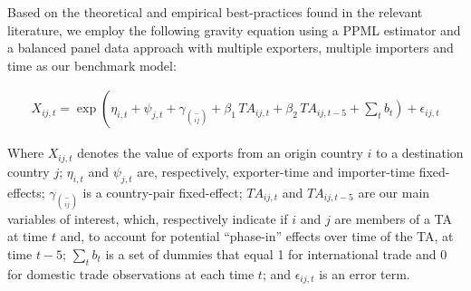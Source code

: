 Based on the theoretical and empirical best-practices found in the
relevant literature, we employ the following gravity equation using a
PPML estimator and a balanced panel data approach with multiple
exporters, multiple importers and time as our benchmark model:

\begin{multline}
    X_{ij,t} = \exp\left(\eta_{i,t} + \psi_{j,t} + \gamma_{\binom{-}{ij}} + \beta_{1} \, TA_{ij,t} \right. + \beta_{2} \, TA_{ij,t-5} + \left. \sum_{t} b_{t} \right) + \epsilon_{ij,t}
\end{multline}

Where \(X_{ij,t}\) denotes the value of exports from an origin country
\(i\) to a destination country \(j\); \(\eta_{i,t}\) and \(\psi_{j,t}\)
are, respectively, exporter-time and importer-time fixed-effects;
\(\gamma_{\binom{-}{ij}}\) is a country-pair fixed-effect;
\({TA}_{ij,t}\) and \({TA}_{ij,t - 5}\) are our main variables of
interest, which, respectively indicate if \(i\) and \(j\) are members of
a TA at time \(t\) and, to account for potential ``phase-in'' effects
over time of the TA, at time \(t - 5\); \(\sum_{t}^{}b_{t}\) is a set of
dummies that equal 1 for international trade and 0 for domestic trade
observations at each time \(t\); and \(\epsilon_{ij,t}\) is an error
term.